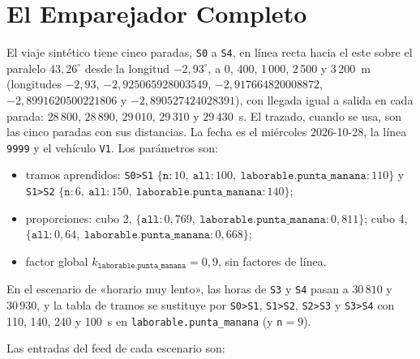 \section{El Emparejador Completo}

El viaje sintético tiene cinco paradas, \texttt{S0} a \texttt{S4}, en línea recta hacia el este sobre el paralelo
$43{,}26^\circ$ desde la longitud $-2{,}93^\circ$, a 0, 400, 1\,000, 2\,500 y 3\,200~m (longitudes
$-2{,}93$, $-2{,}925065928003549$, $-2{,}917664820008872$, $-2{,}8991620500221806$ y $-2{,}890527424028391$), con
llegada igual a salida en cada parada: $28\,800$, $28\,890$, $29\,010$, $29\,310$ y $29\,430$~s. El trazado, cuando se
usa, son las cinco paradas con sus distancias. La fecha es el miércoles 2026-10-28, la línea \texttt{9999} y el
vehículo \texttt{V1}. Los parámetros son:

\begin{itemize}
  \item tramos aprendidos: \texttt{S0>S1} $\{\texttt{n}:10,\ \texttt{all}:100,\ \texttt{laborable.punta\_manana}:110\}$
        y \texttt{S1>S2} $\{\texttt{n}:6,\ \texttt{all}:150,\ \texttt{laborable.punta\_manana}:140\}$;
  \item proporciones: cubo 2, $\{\texttt{all}:0{,}769,\ \texttt{laborable.punta\_manana}:0{,}811\}$; cubo 4,
        $\{\texttt{all}:0{,}64,\ \texttt{laborable.punta\_manana}:0{,}668\}$;
  \item factor global $k_{\texttt{laborable.punta\_manana}}=0{,}9$, sin factores de línea.
\end{itemize}

\noindent En el escenario de «horario muy lento», las horas de \texttt{S3} y \texttt{S4} pasan a $30\,810$ y
$30\,930$, y la tabla de tramos se sustituye por \texttt{S0>S1}, \texttt{S1>S2}, \texttt{S2>S3} y \texttt{S3>S4} con 110,
140, 240 y 100~s en \texttt{laborable.punta\_manana} (y \texttt{n}$=9$).

Las entradas del feed de cada escenario son:

